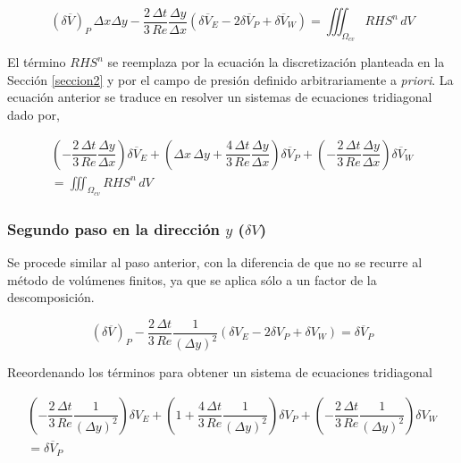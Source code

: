 \begin{equation}
(\delta \overline{V})_P \, \Delta x \Delta y - \dfrac{2 \, \Delta t}{3 \, Re} \dfrac{\Delta y}{\Delta x} \left( \delta \overline{V}_E -2 \delta \overline{V}_P + \delta \overline{V}_W \right) = \iiint_{\Omega_{cv}} RHS^n \, dV
\end{equation}

El término $RHS^n$ se reemplaza por la ecuación la discretización planteada en la Sección \ref{seccion2} y por el campo de presión definido arbitrariamente a \textit{priori}. La ecuación anterior se traduce en resolver un sistemas de ecuaciones tridiagonal dado por,

\begin{equation}
\begin{split}
\left( - \dfrac{2 \, \Delta t}{3 \, Re} \dfrac{\Delta y}{\Delta x}  \right) \delta \overline{V}_E + \left( \Delta x \, \Delta y + \dfrac{4 \, \Delta t}{3 \, Re} \dfrac{\Delta y}{\Delta x}  \right) \delta \overline{V}_P + \left( - \dfrac{2 \, \Delta t}{3 \, Re} \dfrac{\Delta y}{\Delta x}  \right) \delta \overline{V}_W \\
 = \iiint_{\Omega_{cv}} RHS^n \, dV
\end{split}
\end{equation}

\subsubsection{Segundo paso en la dirección $y$ ($\delta V$)}

Se procede similar al paso anterior, con la diferencia de que no se recurre al método de volúmenes finitos, ya que se aplica sólo a un factor de la descomposición.  

\begin{equation}
(\delta \overline{V})_P - \dfrac{2 \, \Delta t}{3 \, Re} \dfrac{1}{(\Delta y)^2} \left( \delta V_E -2 \delta V_P + \delta V_W \right) = \delta \overline{V}_P
\end{equation}

Reeordenando los términos para obtener un sistema de ecuaciones tridiagonal

\begin{equation}
\begin{split}
\left( - \dfrac{2 \, \Delta t}{3 \, Re} \dfrac{1}{(\Delta y)^2}  \right) \delta V_E + \left( 1 + \dfrac{4 \, \Delta t}{3 \, Re} \dfrac{1}{(\Delta y)^2}  \right) \delta V_P + \left( - \dfrac{2 \, \Delta t}{3 \, Re} \dfrac{1}{(\Delta y)^2}  \right) \delta V_W \\
 = \delta \overline{V}_P
\end{split}
\end{equation}

